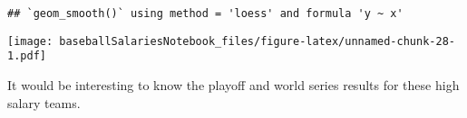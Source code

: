 \documentclass[]{article}
\begin{document}
\begin{verbatim}
## `geom_smooth()` using method = 'loess' and formula 'y ~ x'
\end{verbatim}

\texttt{[image: baseballSalariesNotebook\_files/figure-latex/unnamed-chunk-28-1.pdf]}

It would be interesting to know the playoff and world series results for
these high salary teams.
\end{document}
